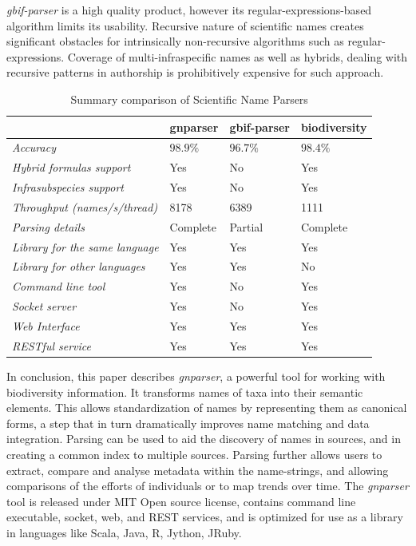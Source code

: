 \documentclass{bmcart}
\begin{document}
\textit{gbif-parser} is a high quality product, however its regular-expressions-based algorithm limits its usability. Recursive nature of scientific names creates significant obstacles for intrinsically non-recursive algorithms such as regular-expressions. Coverage of multi-infraspecific names as well as hybrids, dealing with recursive patterns in authorship is prohibitively expensive for such approach.

\begin{table}[htb]
  \begin{center}
    \caption{Summary comparison of Scientific Name Parsers}
    \label{table:summary}
    \resizebox{12.5cm}{!} {\begin{tabular}{|l|*{3}{l}|}
      \hline
                             & gnparser & gbif-parser & biodiversity \\
      \hline
      \textit{Accuracy}                     & $98.9\%$ & $96.7\%$ & $98.4\%$\\
      \textit{Hybrid formulas support}      & Yes      & No       & Yes     \\
      \textit{Infrasubspecies support}      & Yes      & No       & Yes     \\
      \textit{Throughput (names/s/thread)}  & 8178     & 6389     & 1111    \\
      \textit{Parsing details}              & Complete & Partial  & Complete\\
      \textit{Library for the same language}& Yes      & Yes      & Yes     \\
      \textit{Library for other languages}  & Yes      & Yes      & No      \\
      \textit{Command line tool}            & Yes      & No       & Yes     \\
      \textit{Socket server}                & Yes      & No       & Yes     \\
      \textit{Web Interface}                & Yes      & Yes      & Yes     \\
      \textit{RESTful service}              & Yes      & Yes      & Yes     \\
      \hline
    \end{tabular}
  }
  \end{center}
\end{table}




In conclusion, this paper describes \textit{gnparser}, a powerful tool for working with biodiversity information. It transforms names of taxa into their semantic elements. This  allows standardization of names by representing them as canonical forms, a step that in turn dramatically improves name matching and data integration. Parsing can be used to aid the discovery of names in sources, and in creating a common index to multiple sources. Parsing further allows users to extract, compare and analyse metadata within the name-strings, and allowing comparisons of the efforts of individuals or to map trends over time. The \textit{gnparser} tool is released under MIT Open source license, contains command line executable, socket, web, and REST services, and is optimized for use as a library in languages like Scala, Java, R, Jython, JRuby.
\end{document}
